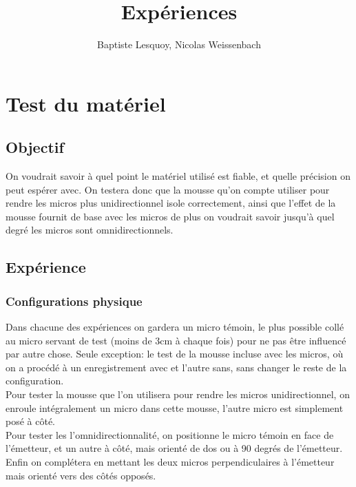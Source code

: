 \documentclass[12pt,a4paper]{report}
\author{Baptiste Lesquoy, Nicolas Weissenbach}
\title{Expériences}
\begin{document}
\maketitle
\tableofcontents

\chapter{Test du matériel}

\section{Objectif}
On voudrait savoir à quel point le matériel utilisé est fiable, et quelle précision on peut espérer avec.
On testera donc que la mousse qu'on compte utiliser pour rendre les micros plus unidirectionnel isole correctement, ainsi que l'effet de la mousse fournit de base avec les micros de plus on voudrait savoir jusqu'à quel degré les micros sont omnidirectionnels.
\section{Expérience}

\subsection{Configurations physique}
Dans chacune des expériences on gardera un micro témoin, le plus possible collé au micro servant de test (moins de 3cm à chaque fois) pour ne pas être influencé par autre chose. Seule exception: le test de la mousse incluse avec les micros, où on a procédé à un enregistrement avec et l'autre sans, sans changer le reste de la configuration.\\
Pour tester la mousse que l'on utilisera pour rendre les micros unidirectionnel, on enroule intégralement un micro dans cette mousse, l'autre micro est simplement posé à côté.\\
Pour tester les l'omnidirectionnalité, on positionne le micro témoin en face de l'émetteur, et un autre à côté, mais orienté de dos ou à 90 degrés de l'émetteur. Enfin on complétera en mettant les deux micros perpendiculaires à l'émetteur mais orienté vers des côtés opposés.
\end{document}
